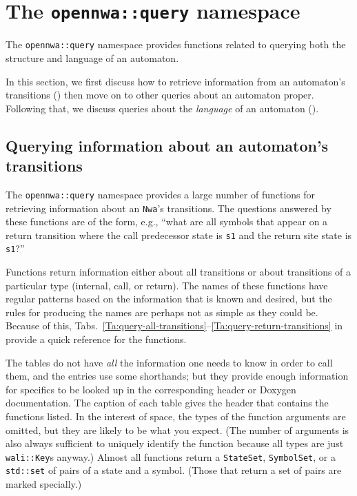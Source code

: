 \section{The \texttt{opennwa::query} namespace}
\label{Se:namespace-query}

The \texttt{opennwa::query} namespace provides functions related to
querying both the structure and language of an automaton.

In this section, we first discuss how to retrieve information from an
automaton's transitions () then move on to other
queries about an automaton proper.
Following that, we discuss queries about the
\textsl{language} of an automaton ().


\subsection{Querying information about an automaton's transitions}
\label{Se:query-transitions}
The \texttt{opennwa::query} namespace provides a large number of functions
for retrieving information about an \texttt{Nwa}'s transitions. The questions
answered by these functions are of the form, e.g., ``what are all symbols that
appear on a return transition where the call predecessor state is \texttt{s1}
and the return site state is \texttt{s1}?''

Functions return information either about all transitions or about
transitions of a particular type (internal, call, or return). The names of
these functions have regular patterns based on the information that is
known and desired, but the rules for producing the names are perhaps not as
simple as they could be. Because of this,
Tabs.~\ref{Ta:query-all-transitions}--\ref{Ta:query-return-transitions} in 
provide a quick reference for the functions.

The tables do not have \textsl{all} the information one needs to know in
order to call them, and the entries use some shorthands; but they provide enough
information for specifics to be
looked up in the corresponding header or Doxygen documentation. The caption of each table
gives the header that contains the functions listed. In the interest of
space, the types of the function arguments are omitted, but they are likely to
be what you expect. (The number of arguments is also always sufficient to
uniquely identify the function because all types are just \texttt{wali::Key}s
anyway.) Almost all functions return a \texttt{StateSet}, \texttt{SymbolSet},
or a \texttt{std::set} of pairs of a state and a symbol. (Those that return a
set of pairs are marked specially.)

